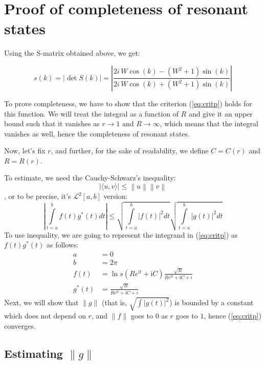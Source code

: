 \documentclass{gCOV2e}
\theoremstyle{plain}%
\theoremstyle{definition}
\theoremstyle{remark}
\begin{document}
\section{Proof of completeness of resonant states}
Using the S-matrix obtained above, we get:

\begin{equation}\label{eq:bundle_s}
s(k) = \left|\det S(k)\right| = \left|\frac{2 i \, W \cos\left(k\right) - {\left(W^{2} + 1\right)} \sin\left(k\right)}{2 i \, W \cos\left(k\right) + {\left(W^{2} + 1\right)} \sin\left(k\right)}\right|
\end{equation}

To prove completeness, we have to show that the criterion (\ref{eq:critp}) holds for this function. We will treat the integral as a function of $R$ and give it an upper bound such that it vanishes as $r \to 1$ and $R \to \infty$, which means that the integral vanishes as well, hence the completeness of resonant states.

Now, let's fix $r$, and further, for the sake of readability, we define $C = C(r)$ and $R = R(r)$.

To estimate, we need the Cauchy-Schwarz's inequality:
\[
\big| \langle u,v \rangle \big| \leq \left\|u\right\| \left\|v\right\|
\]
, or to be precise, it's $\mathcal{L}^2[a, b]$ version:
\[
\left|
\int\limits_{t=a}^{b} f(t) g^*(t) dt
\right|
\le
\sqrt{\int\limits_{t=a}^b \left|f(t)\right|^2 dt }
\sqrt{\int\limits_{t=a}^b \left|g(t)\right|^2 dt }
\]
% 
To use inequality, we are going to represent the integrand in (\ref{eq:critp}) as $f(t) g^*(t)$ as follows:
\begin{equation}\label{eq:split}
\begin{aligned}
a      &= 0 \\
b      &= 2 \pi \\
f(t)   &= \ln s(R e^{\mathrm{i} t} + \mathrm{i} C) \frac{\sqrt{R}}{R e^{\mathrm{i} t} + \mathrm{i} C + i} \\
g^*(t) &= \frac{\sqrt{R}}{R e^{\mathrm{i} t} + \mathrm{i} C + i}
\end{aligned}
\end{equation}
Next, we will show that $\|g\|$ (that is, $\sqrt{\int \left|g(t)\right|^2}$) is bounded by a constant which does not depend on $r$, and $\|f\|$ goes to $0$ as $r$ goes to $1$, hence (\ref{eq:critp}) converges.

\subsection{Estimating $\|g\|$}
\end{document}
